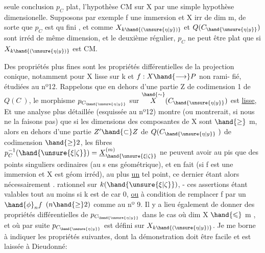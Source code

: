 seule conclusion $p_C$ plat, l'hypothèse CM sur X par une simple hypothèse
dimensionelle. Supposons par exemple f une immersion et X irr de dim m,
de sorte que $p_C$ est qu fini , et comme $X_{k\hand{(\unsure{\eta|y})}}$ et $Q(C_{\hand{\unsure{\eta|y}}})$ sont irréd de
même dimension,  et le deuxième régulier, $p_C$ ne peut être
plat que si $X_{k\hand{(\unsure{\eta|y})}}$ est CM.

Des propriétés plus fines sont les propriétés différentielles de
la projection conique, notamment pour X lisse sur k et $f:X\hand{\longrightarrow} P$ non rami-%
fié, étudiées au nº12.  Rappelons que 
en dehors d'une partie Z de codimension 1 de $Q(C\ )$, le morphisme
$p_{C_{\hand{\unsure{\eta|y}}}}$ sur $\overset{\hand{\sim}}{X}(C_{\hand{\unsure{\eta|y}}})$ est \uline{lisse}, Et une analyse plus détaillée (esquissée au nº12) montre
(ou montrerait, si nous ne la faisons pas) que si les dimensions des composantes de X sont $\hand{\geq}$ m, alors  en dehors d'une partie $Z'\hand{\subset} Z$
de $Q(C_{\hand{\unsure{\eta|y}}}\ )$ de codimension $\hand{\geq} 2$, les fibres $p_C^{-1}(\hand{\unsure{\xi|\zeta}}) = \underline{X}^{(m)}_{\hand{\unsure{\xi|\zeta}}}$ ne peuvent
avoir au pis que des points  singuliers ordinaires (au s ens
géométrique), et en fait (si f est une immersion et X est géom irréd),
 au plus \uline{un} tel point, ce dernier étant alors  nécessairement  .
rationnel sur $k(\hand{\unsure{\xi|\zeta}})$, - ces assertions étant valables tout au moins si
k est de car 0, \uline{ou} à condition de remplacer f par un $\hand{\phi}_n f$ $(n\hand{\geq} 2)$ comme
au nº 9. Il y a lieu également de donner des propriétés différentielles
de $p_{C_{\hand{\unsure{\eta|y}}}}$ dans le cas où dim X $\hand{\leqslant}$ m , et où par suite $p_{C_{\hand{\unsure{\eta|y}}}}$ est défini sur $X_{k\hand{(\unsure{\eta|y})}}$.
Je me borne à indiquer les propriétés suivantes, dont la démonstration
doit être facile et est laissée à Dieudonné:

